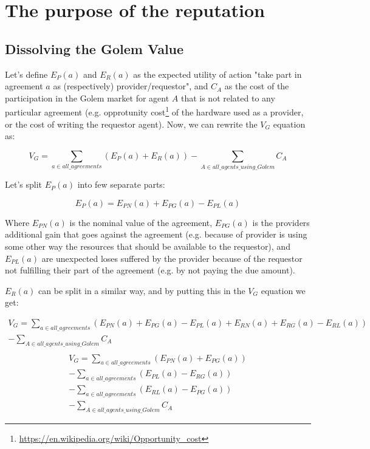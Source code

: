 \documentclass{article}
\begin{document}
\section{The purpose of the reputation}
\subsection{Dissolving the Golem Value}

Let's define $E_P(a)$ and $E_R(a)$ as the expected utility of action "take part in agreement $a$ as (respectively) provider/requestor", and $C_A$ as the cost of
the participation in the Golem market for agent $A$ that is not related to any particular agreement 
(e.g. opprotunity cost\footnote{\href{https://en.wikipedia.org/wiki/Opportunity\_cost}{https://en.wikipedia.org/wiki/Opportunity\_cost}} of the hardware used as a provider, 
or the cost of writing the requestor agent). Now, we can rewrite the $V_G$ equation as:

\begin{equation}
    V_G = \sum_{a \in all\_agreements}(E_P(a) + E_R(a)) - \sum_{A \in all\_agents\_using\_Golem}C_A
\end{equation}

Let's split $E_P(a)$ into few separate parts:

\begin{equation}
    E_P(a) = E_{PN}(a) + E_{PG}(a) - E_{PL}(a)
\end{equation}

Where $E_{PN}(a)$ is the nominal value of the agreement, $E_{PG}(a)$ is the providers additional gain that goes against the agreement 
(e.g. because of provider is using some other way the resources that should be available to the requestor), and $E_{PL}(a)$ are unexpected loses 
suffered by the provider because of the requestor not fulfilling their part of the agreement (e.g. by not paying the due amount).

$E_R(a)$ can be split in a similar way, and by putting this in the $V_G$ equation we get:

\begin{equation}
\begin{split}
    V_G = \sum_{a \in all\_agreements}(E_{PN}(a) + E_{PG}(a) - E_{PL}(a) + E_{RN}(a) + E_{RG}(a) - E_{RL}(a)) \\
            - \sum_{A \in all\_agents\_using\_Golem}C_A \\
\end{split}
\end{equation}
\begin{equation}
\begin{split}
    V_G = \sum_{a \in all\_agreements}(E_{PN}(a) + E_{PG}(a)) \\
          - \sum_{a \in all\_agreements}(E_{PL}(a)- E_{RG}(a)) \\
          - \sum_{a \in all\_agreements}(E_{RL}(a)- E_{PG}(a)) \\
          - \sum_{A \in all\_agents\_using\_Golem}C_A
\end{split}
\end{equation}
\end{document}
